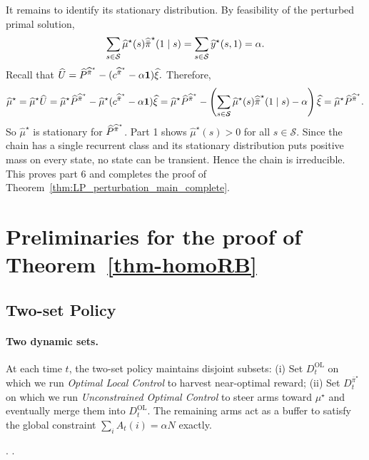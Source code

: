 \documentclass[mnsc,nonblindrev]{informs3}
\newcommand{\Phat}{\widehat{P}}
\newcommand{\one}{\mathbf{1}}
\newcommand{\pihbst}{\widehat{\Bar{\pi}}^\star}
\newcommand{\States}{\mathcal{S}}
\newcommand{\muhat}{\widehat{\mu}}
\newcommand{\uhat}{\widehat{U}}
\newcommand{\yhat}{\widehat{y}}
\newcommand{\xihat}{\widehat{\xi}}
\newcommand{\muhst}{\widehat{\mu}^\star}
\begin{document}
\begin{APPENDICES}
It remains to identify its stationary distribution. By feasibility of the
perturbed primal solution,
\[
    \sum_{s\in\States}\muhat^\star(s)\pihbst(1\mid s)
    =
    \sum_{s\in\States}\yhat^\star(s,1)
    =
    \alpha.
\]
Recall that
\(
    \uhat
    =
    \Phat^{\pihbst}
    -
    (c^{\pihbst}-\alpha\one)\xihat.
\)
Therefore,
\begin{align*}
    \muhst=\muhat^\star\uhat=
    \muhat^\star\Phat^{\pihbst}
    -
    \muhat^\star(c^{\pihbst}-\alpha\one)\xihat  =
    \muhat^\star\Phat^{\pihbst}
    -
    \left(
    \sum_{s\in\States}\muhat^\star(s)\pihbst(1\mid s)-\alpha
    \right)\xihat  =
    \muhat^\star\Phat^{\pihbst}.
\end{align*}
So \(\muhat^\star\) is stationary for \(\Phat^{\pihbst}\). Part 1 shows
\(\muhat^\star(s)>0\) for all \(s\in\States\). Since the chain has a single
recurrent class and its stationary distribution puts positive mass on
every state, no state can be transient. Hence the chain is irreducible. This proves part 6
and completes the proof of
Theorem~\ref{thm:LP_perturbation_main_complete}.





\section{Preliminaries for the proof of Theorem~\ref{thm-homoRB}}
\subsection{Two-set Policy}
\label{subsec:two-set-policy}
\paragraph{Two dynamic sets.}
At each time $t$, the two-set policy maintains disjoint subsets:
(i) Set $D_t^{\mathrm{OL}}$ on which we run \emph{Optimal Local Control} to harvest near-optimal
reward; (ii) Set $D_t^{\bar\pi^\star}$ on which we run \emph{Unconstrained Optimal Control}
to steer arms toward $\mu^\star$ and eventually merge them into $D_t^{\mathrm{OL}}$.
The remaining arms act as a buffer to satisfy the global constraint $\sum_i A_t(i)=\alpha N$ exactly.
\begin{algorithm}[H]
\caption{Two-set policy}
\label{alg:two-set-policy}
.
.


\end{algorithm}
\end{APPENDICES}
\end{document}
